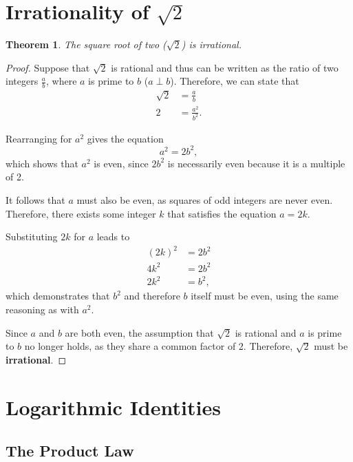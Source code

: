 \documentclass[parskip]{scrartcl}
\newtheorem*{theorem}{Theorem}
\begin{document}
\section{Irrationality of \(\sqrt{2}\)}

\begin{theorem}
  The square root of two (\(\sqrt{2}\)) is irrational.
\end{theorem}

\begin{proof}
  Suppose that \(\sqrt{2}\) is rational and thus can be written as the ratio of
  two integers \(\frac{a}{b}\), where \(a\) is prime to \(b\) (\(a ⟂ b\)).
  Therefore, we can state that
  \begin{align*}
    \sqrt{2} &= \frac{a}{b} \\
    2 &= \frac{a^{2}}{b^{2}}.
  \end{align*}

  Rearranging for \(a^{2}\) gives the equation
  \begin{equation*}
    a^{2} = 2b^{2},
  \end{equation*}
  which shows that \(a^{2}\) is even, since \(2b^{2}\) is necessarily even
  because it is a multiple of 2.

  It follows that \(a\) must also be even, as squares of odd integers are never
  even. Therefore, there exists some integer \(k\) that satisfies the equation
  \(a = 2k\).

  Substituting \(2k\) for \(a\) leads to
  \begin{align*}
    {(2k)}^{2} &= 2b^{2} \\
    4k^{2} &= 2b^{2} \\
    2k^{2} &= b^{2},
  \end{align*}
  which demonstrates that \(b^{2}\) and therefore \(b\) itself must be even,
  using the same reasoning as with \(a^{2}\).

  Since \(a\) and \(b\) are both even, the assumption that \(\sqrt{2}\) is
  rational and \(a\) is prime to \(b\) no longer holds, as they share a common
  factor of 2. Therefore, \(\sqrt{2}\) must be \textbf{irrational}.
\end{proof}

\section{Logarithmic Identities}

\subsection{The Product Law}
\end{document}
